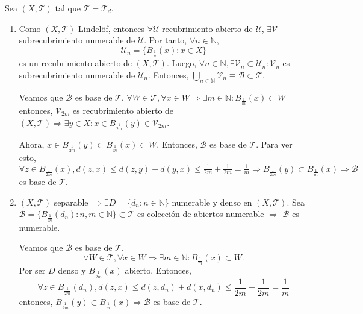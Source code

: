 \begin{dem}
  Sea $( X, \mathcal{T} )$ tal que $\mathcal{T} = \mathcal{T}_{d}$.

  \begin{enumerate}[label=(\roman*)]
    \item [\fbox{$b \Rightarrow a$}] Como $( X, \mathcal{T} )$ Lindelöf, entonces $ \forall \mathcal{U}$ recubrimiento abierto de $\mathcal{U}$, $\exists \mathcal{V}$ subrecubrimiento numerable de $\mathcal{U}$. Por tanto, $\forall n \in \mathbb{N}$,
  \[ 
    \mathcal{U}_{n} = \{ B_{\frac{1}{n}}(x) : x \in X \}
  \] 
  es un recubrimiento abierto de $( X, \mathcal{T} )$. Luego, $\forall n \in \mathbb{N}, \exists \mathcal{V}_{n} \subset \mathcal{U}_{n} : \mathcal{V}_{n}$ es subrecubrimiento numerable de $\mathcal{U}_{n}$. Entonces, $\bigcup_{n \in \mathbb{N}} \mathcal{V}_{n} \equiv \mathcal{B} \subset \mathcal{T}$.

  Veamos que $\mathcal{B}$ es base de $\mathcal{T}$. $\forall W \in \mathcal{T}, \forall x \in W \Rightarrow \exists m \in \mathbb{N} : B_{\frac{1}{m}}(x) \subset W$ entonces,  $\mathcal{V}_{2 m}$ es recubrimiento abierto de $( X, \mathcal{T} ) \Rightarrow \exists y \in X : x \in B_{\frac{1}{2 m}}(y) \in \mathcal{V}_{2 m}$.

  Ahora, $x \in B_{\frac{1}{2 m}}(y) \subset B_{\frac{1}{m}}(x) \subset W$. Entonces, $\mathcal{B}$ es base de $\mathcal{T}$. Para ver esto, $\forall z \in B_{\frac{1}{2 m }}(x), d(z, x) \leq d(z, y) + d(y, x) \leq \frac{1}{2 m} + \frac{1}{2 m} = \frac{1}{m} \Rightarrow B_{\frac{1}{2 m}}(y) \subset B_{\frac{1}{m}}(x) \Rightarrow \mathcal{B}$ es base de $\mathcal{T}$.

\item [\fbox{$c \Rightarrow a$}] $( X, \mathcal{T} )$ separable $\Rightarrow \exists D =\{ d_{n} :  n \in \mathbb{N} \}$ numerable y denso en $( X, \mathcal{T} )$. Sea $ \mathcal{B} = \{  B_{\frac{1}{m}}(d_{n}) : n, m \in \mathbb{N} \} \subset \mathcal{T}$ es colección de abiertos numerable $\Rightarrow$ $\mathcal{B}$ es numerable. 

  Veamos que $\mathcal{B}$ es base de $\mathcal{T}$.
  \[
    \forall W \in \mathcal{T}, \forall x \in W \Rightarrow \exists m \in \mathbb{N} : B_{\frac{1}{m}}(x) \subset W.
  \]
  Por ser $D$ denso y $B_{\frac{1}{2 m}}(x)$ abierto. Entonces,
  \[
    \forall z \in B_{\frac{1}{2 m }}(d_{n}), d(z, x) \leq d(z, d_{n}) + d(x, d_{n}) \leq \frac{1}{2 m} + \frac{1}{2 m} = \frac{1}{m} 
  \]
  entonces, $ B_{\frac{1}{2 m}}(y) \subset B_{\frac{1}{m}}(x) \Rightarrow \mathcal{B}$ es base de $\mathcal{T}$. 
  \end{enumerate}
\end{dem}


